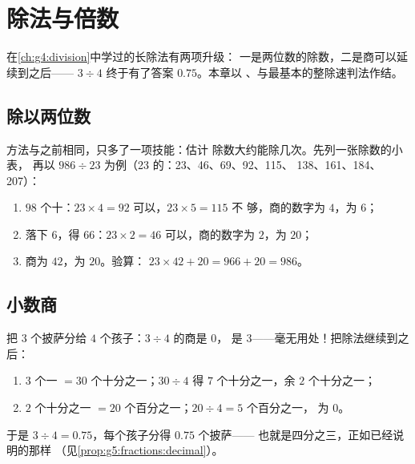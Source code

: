 \chapter{除法与倍数}\label{ch:g5:division}

在\cref{ch:g4:division}中学过的长除法有两项升级：
一是两位数的除数，二是商可以延续到之后——
$3 \div 4$ 终于有了答案 $0.75$。本章以
、与最基本的整除速判法作结。

\section{除以两位数}

\begin{method}[两位数除数]\label{met:g5:division:twodigits}
方法与之前相同，只多了一项技能：估计
除数大约能除几次。先列一张除数的小表，
再以 $986 \div 23$ 为例（23 的：23、46、69、92、115、
138、161、184、207）：
\begin{enumerate}
  \item $98$ 个十：$23 \times 4 = 92$ 可以，$23 \times 5 = 115$ 不
        够，商的数字为 $4$，为 $6$；
  \item 落下 $6$，得 $66$：$23 \times 2 = 46$ 可以，商的数字为
        $2$，为 $20$；
  \item 商为 $42$，为 $20$。验算：
        $23 \times 42 + 20 = 966 + 20 = 986$。
\end{enumerate}
\end{method}

\section{小数商}

\begin{example}[不肯停在余数处的除法]\label{ex:g5:division:decimal}
把 $3$ 个披萨分给 $4$ 个孩子：$3 \div 4$ 的商是 $0$，
是 $3$——毫无用处！把除法继续到之后：
\begin{enumerate}
  \item $3$ 个一 $= 30$ 个十分之一；$30 \div 4$ 得 $7$ 个十分之一，余
        $2$ 个十分之一；
  \item $2$ 个十分之一 $= 20$ 个百分之一；$20 \div 4 = 5$ 个百分之一，
        为 $0$。
\end{enumerate}
于是 $3 \div 4 = 0.75$，每个孩子分得 $0.75$ 个披萨——
也就是四分之三，正如已经说明的那样
（见\cref{prop:g5:fractions:decimal}）。
\end{example}

